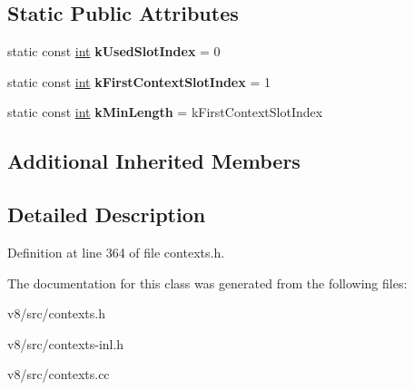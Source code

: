 \subsection*{Static Public Attributes}
\begin{DoxyCompactItemize}
\item 
\mbox{\label{classv8_1_1internal_1_1ScriptContextTable_a71217371a3e3adcab26ab6a73c053a1d}} 
static const \mbox{\hyperlink{classint}{int}} {\bfseries k\+Used\+Slot\+Index} = 0
\item 
\mbox{\label{classv8_1_1internal_1_1ScriptContextTable_a361442a537ea02e2a4f51a7eb69c1d7b}} 
static const \mbox{\hyperlink{classint}{int}} {\bfseries k\+First\+Context\+Slot\+Index} = 1
\item 
\mbox{\label{classv8_1_1internal_1_1ScriptContextTable_ad44250967e12895c5801371db970035e}} 
static const \mbox{\hyperlink{classint}{int}} {\bfseries k\+Min\+Length} = k\+First\+Context\+Slot\+Index
\end{DoxyCompactItemize}
\subsection*{Additional Inherited Members}


\subsection{Detailed Description}


Definition at line 364 of file contexts.\+h.



The documentation for this class was generated from the following files\+:\begin{DoxyCompactItemize}
\item 
v8/src/contexts.\+h\item 
v8/src/contexts-\/inl.\+h\item 
v8/src/contexts.\+cc\end{DoxyCompactItemize}
